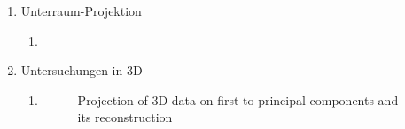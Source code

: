 \documentclass[]{report}
\newlength\figureheight
\begin{document}
\begin{enumerate}
\begin{enumerate}
	\end{enumerate}
	\item Unterraum-Projektion
	\begin{enumerate}
		\item
	\end{enumerate}
	
	\item Untersuchungen in 3D
	\begin{enumerate}
		\item
		\setlength\figureheight{10cm}
		\begin{figure}[tbp!]
			\centering
			
			\caption{Projection of 3D data on first to principal components and its reconstruction} 
			\label{fig:3D projection and reconstruction}
		\end{figure}
	\end{enumerate}
	

\end{enumerate}
\end{document}
